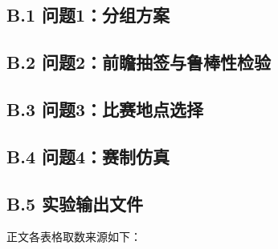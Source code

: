 \documentclass[12pt,a4paper]{article}
\begin{document}
\subsection*{B.1 问题1：分组方案}



\subsection*{B.2 问题2：前瞻抽签与鲁棒性检验}








\subsection*{B.3 问题3：比赛地点选择}



\subsection*{B.4 问题4：赛制仿真}



\subsection*{B.5 实验输出文件}

正文各表格取数来源如下：
\end{document}
